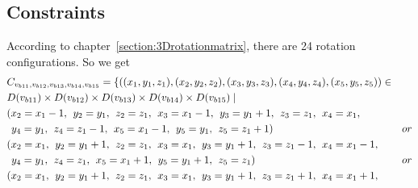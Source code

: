 \subsection{Constraints}
According to chapter~\ref{section:3Drotationmatrix}, there are 24 rotation configurations. So we get
\begin{align*}
&\Cons{b11}{b12}{b13}{b14}{b15}=\{((x_{1},y_{1},z_{1}),(x_{2},y_{2},z_{2}),(x_{3},y_{3},z_{3}),(x_{4},y_{4},z_{4}),(x_{5},y_{5},z_{5}))\in \\
&\Domain {b11} \times \Domain{b12}\times \Domain{b13}\times \Domain{b14}\times \Domain{b15} \mid\\
&(x_{2}=x_{1}-1,\hspace{1ex} y_{2}=y_{1},\hspace{1ex} z_{2}=z_{1},\hspace{1ex} x_{3}=x_{1}-1,\hspace{1ex} y_{3}=y_{1}+1,\hspace{1ex} z_{3}=z_{1},\hspace{1ex} x_{4}=x_{1},\\
&\hspace{1ex} y_{4}=y_{1},\hspace{1ex} z_{4}=z_{1}-1,\hspace{1ex} x_{5}=x_{1}-1,\hspace{1ex} y_{5}=y_{1},\hspace{1ex} z_{5}=z_{1}+1)&or\\ 
&(x_{2}=x_{1},\hspace{1ex} y_{2}=y_{1}+1,\hspace{1ex} z_{2}=z_{1},\hspace{1ex} x_{3}=x_{1},\hspace{1ex} y_{3}=y_{1}+1,\hspace{1ex} z_{3}=z_{1}-1,\hspace{1ex} x_{4}=x_{1}-1,\\
&\hspace{1ex} y_{4}=y_{1},\hspace{1ex} z_{4}=z_{1},\hspace{1ex} x_{5}=x_{1}+1,\hspace{1ex} y_{5}=y_{1}+1,\hspace{1ex} z_{5}=z_{1})&or\\ 
&(x_{2}=x_{1},\hspace{1ex} y_{2}=y_{1}+1,\hspace{1ex} z_{2}=z_{1},\hspace{1ex} x_{3}=x_{1},\hspace{1ex} y_{3}=y_{1}+1,\hspace{1ex} z_{3}=z_{1}+1,\hspace{1ex} x_{4}=x_{1}+1,\\

\end{align*}

